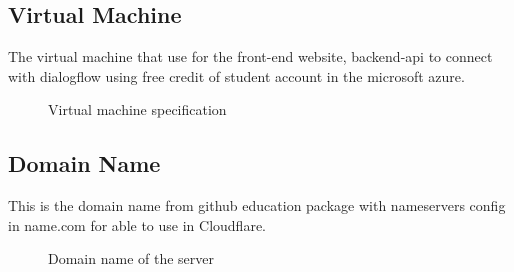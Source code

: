 \documentclass[12pt,oneside,openright,a4paper]{cpe-english-project}
\begin{document}
	\subsection{Virtual Machine}
		The virtual machine that use for the front-end website, backend-api to connect with dialogflow using free credit of student account in the microsoft azure.
		\begin{figure}[!h]\centering
			\caption{Virtual machine specification}\label{fig:Virtual machine specification}
		\end{figure}
\pagebreak
	\subsection{Domain Name}
		This is the domain name from github education package with nameservers config in name.com for able to use in Cloudflare.
		\begin{figure}[!h]\centering
			\caption{Domain name of the server}\label{fig:Domain name of the server}
		\end{figure}
\end{document}
